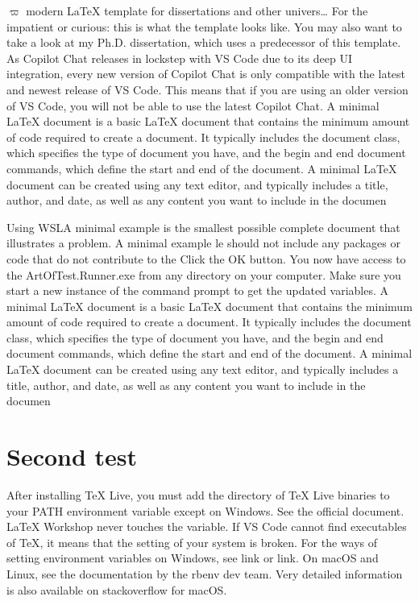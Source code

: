 \documentclass{article}
\begin{document}
$\varpi$
\lipsum
modern LaTeX template for dissertations and other univers…
For the impatient or curious: this is what the template looks like. You may also want to take a look at my Ph.D. dissertation, which uses a predecessor of this template.
As Copilot Chat releases in lockstep with VS Code due to its deep UI integration, 
every new version of Copilot Chat is only compatible with the latest and newest release of VS Code. 
This means that if you are using an older version of VS Code, you will not be able to use the latest Copilot Chat.
A minimal LaTeX document is a basic LaTeX document that contains the minimum amount of code required to create a document. It typically includes the document class, which specifies the type of document you have, and the begin and end document commands, which define the start and end of the document. A minimal LaTeX document can be created using any text editor, and typically includes a title, author, and date, as well as any content you want to include in the documen

Using WSLA minimal example is the smallest possible complete document that illustrates a problem. A minimal example le should not include any packages or code that do not contribute to the 
Click the OK button. You now have access to the ArtOfTest.Runner.exe from any directory on your computer. Make sure you start a new instance of the command prompt to get the updated variables.
A minimal LaTeX document is a basic LaTeX document that contains the minimum amount of code required to create a document. It typically includes the document class, which specifies the type of document you have, and the begin and end document commands, which define the start and end of the document. A minimal LaTeX document can be created using any text editor, and typically includes a title, author, and date, as well as any content you want to include in the documen

\section[short]{Second test}



After installing TeX Live, you must add the directory of TeX Live binaries to your PATH environment variable except on Windows. See the official document. LaTeX Workshop never touches the variable. If VS Code cannot find executables of TeX, it means that the setting of your system is broken. For the ways of setting environment variables on Windows, see link or link. On macOS and Linux, see the documentation by the rbenv dev team. Very detailed information is also available on stackoverflow for macOS.
\end{document}
